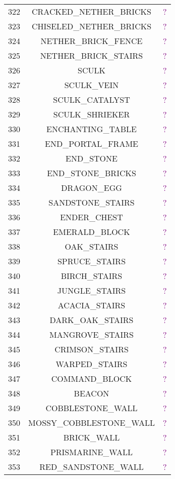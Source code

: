 \documentclass[11pt]{article}
\newcommand\myworries[1]{\textcolor{purple}{#1}}
\begin{document}
\begin{longtable}{ |c|c|c| }
	322 & CRACKED\_NETHER\_BRICKS & \myworries{?} \\
	323 & CHISELED\_NETHER\_BRICKS & \myworries{?} \\
	324 & NETHER\_BRICK\_FENCE & \myworries{?} \\
	325 & NETHER\_BRICK\_STAIRS & \myworries{?} \\
	326 & SCULK & \myworries{?} \\
	327 & SCULK\_VEIN & \myworries{?} \\
	328 & SCULK\_CATALYST & \myworries{?} \\
	329 & SCULK\_SHRIEKER & \myworries{?} \\
	330 & ENCHANTING\_TABLE & \myworries{?} \\
	331 & END\_PORTAL\_FRAME & \myworries{?} \\
	332 & END\_STONE & \myworries{?} \\
	333 & END\_STONE\_BRICKS & \myworries{?} \\
	334 & DRAGON\_EGG & \myworries{?} \\
	335 & SANDSTONE\_STAIRS & \myworries{?} \\
	336 & ENDER\_CHEST & \myworries{?} \\
	337 & EMERALD\_BLOCK & \myworries{?} \\
	338 & OAK\_STAIRS & \myworries{?} \\
	339 & SPRUCE\_STAIRS & \myworries{?} \\
	340 & BIRCH\_STAIRS & \myworries{?} \\
	341 & JUNGLE\_STAIRS & \myworries{?} \\
	342 & ACACIA\_STAIRS & \myworries{?} \\
	343 & DARK\_OAK\_STAIRS & \myworries{?} \\
	344 & MANGROVE\_STAIRS & \myworries{?} \\
	345 & CRIMSON\_STAIRS & \myworries{?} \\
	346 & WARPED\_STAIRS & \myworries{?} \\
	347 & COMMAND\_BLOCK & \myworries{?} \\
	348 & BEACON & \myworries{?} \\
	349 & COBBLESTONE\_WALL & \myworries{?} \\
	350 & MOSSY\_COBBLESTONE\_WALL & \myworries{?} \\
	351 & BRICK\_WALL & \myworries{?} \\
	352 & PRISMARINE\_WALL & \myworries{?} \\
	353 & RED\_SANDSTONE\_WALL & \myworries{?} \\

\end{longtable}
\end{document}
